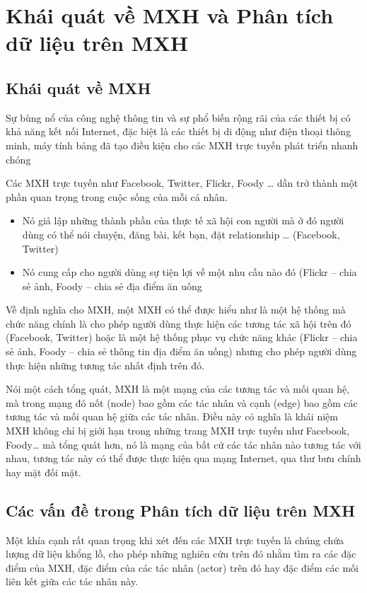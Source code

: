\documentclass[12pt]{extarticle}
\begin{document}
	\section{Khái quát về MXH và Phân tích dữ liệu trên MXH}
		\subsection{Khái quát về MXH}
			\par Sự bùng nổ của công nghệ thông tin và sự phổ biến rộng rãi của các thiết bị có khả năng kết nối Internet, đặc biệt là các thiết bị di động như điện thoại thông minh, máy tính bảng đã tạo điều kiện cho các MXH trực tuyến phát triển nhanh chóng
			\par Các MXH trực tuyến như Facebook, Twitter, Flickr, Foody … dần trở thành một phần quan trọng trong cuộc sống của mỗi cá nhân.
			\begin{itemize}
				\item{Nó giả lập những thành phần của thực tế xã hội con người mà ở đó người dùng có thể nói chuyện, đăng bài, kết bạn, đặt relationship … (Facebook, Twitter)}	
				\item{Nó cung cấp cho người dùng sự tiện lợi về một nhu cầu nào đó (Flickr – chia sẻ ảnh, Foody – chia sẻ địa điểm ăn uống}
			\end{itemize}

			\par Về định nghĩa cho MXH, một MXH có thể được hiểu như là một hệ thống mà chức năng chính là cho phép người dùng thực hiện các tương tác xã hội trên đó (Facebook, Twitter) hoặc là một hệ thống phục vụ chức năng khác (Flickr – chia sẻ ảnh, Foody – chia sẻ thông tin địa điểm ăn uống) nhưng cho phép người dùng thực hiện những tương tác nhất định trên đó. 
			\par Nói một cách tổng quát, MXH là một mạng của các tương tác và mối quan hệ, mà trong mạng đó nốt (node) bao gồm các tác nhân và cạnh (edge) bao gồm các tương tác và mối quan hệ giữa các tác nhân. Điều này có nghĩa là khái niệm MXH không chỉ bị giới hạn trong những trang MXH trực tuyến như Facebook, Foody… mà tổng quát hơn, nó là mạng của bất cứ các tác nhân nào tương tác với nhau, tương tác này có thể được thực hiện qua mạng Internet, qua thư bưu chính hay mặt đối mặt.

		\subsection{Các vấn đề trong Phân tích dữ liệu trên MXH}
			\par Một khía cạnh rất quan trọng khi xét đến các MXH trực tuyến là chúng chứa lượng dữ liệu khổng lồ, cho phép những nghiên cứu trên đó nhằm tìm ra các đặc điểm của MXH, đặc điểm của các tác nhân (actor) trên đó hay đặc điểm các mối liên kết giữa các tác nhân này.
\end{document}
